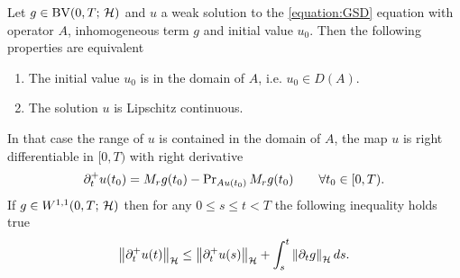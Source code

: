 \begin{proposition}\label{proposition:gsd sol is lipschitz}
	Let $ g\in \mathrm{BV}(0,T;\,\mathcal{H}) $ and $ u $ a weak solution to the
	\ref{equation:GSD} equation with operator $ A $,
	inhomogeneous term $ g $ and initial value $ u_0 $.
	Then the following properties are equivalent 
	\begin{enumerate}[label=(\roman*)]
		\item The initial value $ u_0 $
		is in the domain of $ A $, i.e. $ u_0\in D(A) $.
		\item The solution $ u $ is Lipschitz continuous.
	\end{enumerate}
	In that case the range of $ u $ is contained in the domain
	of $ A $, the map $ u $ is right differentiable in $ [0,T) $
	with right derivative
	\begin{align}\label{equation:right der of Lip sol}
		\partial_t^+ u(t_0)=M_rg(t_0)-\operatorname{\mathrm{Pr}}_{Au(t_0)} M_rg(t_0)
		\qquad\forall t_0\in [0,T).
	\end{align} 
	If $ g\in W^{1,1}(0,T;\,\mathcal{H}) $ then 
	for any $ 0\leq s\leq t< T $ the following
	inequality holds true
	\begin{align}\label{equation:bound right der}
		\left\Vert \partial_t^+ u(t)\right\Vert_{\mathcal{H}}
		\leq \left\Vert \partial_t^+ u(s)\right\Vert_{\mathcal{H}}+\int_s^t \left\Vert \partial_t g\right\Vert_{\mathcal{H}} ds.
	\end{align}
\end{proposition}
